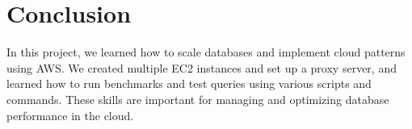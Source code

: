 \documentclass[11pt]{article}
\begin{document}
    \section{Conclusion}
    In this project, we learned how to scale databases and implement cloud patterns using AWS.
    We created multiple EC2 instances and set up a proxy server, and learned how to run benchmarks and test queries using various scripts and commands.
    These skills are important for managing and optimizing database performance in the cloud.
\end{document}
